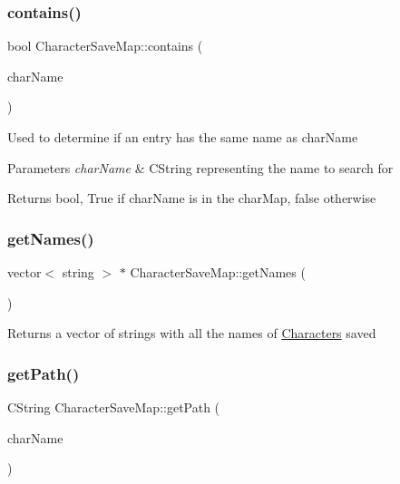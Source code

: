 \subsubsection{\texorpdfstring{contains()}{contains()}}
{\footnotesize\ttfamily bool Character\+Save\+Map\+::contains (\begin{DoxyParamCaption}\item[{const C\+String \&}]{char\+Name }\end{DoxyParamCaption})}

Used to determine if an entry has the same name as char\+Name 
\begin{DoxyParams}{Parameters}
{\em char\+Name} & C\+String representing the name to search for \\
\hline
\end{DoxyParams}
\begin{DoxyReturn}{Returns}
bool, True if char\+Name is in the char\+Map, false otherwise 
\end{DoxyReturn}
\hypertarget{class_character_save_map_a5b41ffbec363cf0c4bacc8411dcdfc90}{}\label{class_character_save_map_a5b41ffbec363cf0c4bacc8411dcdfc90} 
\subsubsection{\texorpdfstring{get\+Names()}{getNames()}}
{\footnotesize\ttfamily vector$<$ string $>$ $\ast$ Character\+Save\+Map\+::get\+Names (\begin{DoxyParamCaption}{ }\end{DoxyParamCaption})}

Returns a vector of strings with all the names of \hyperlink{class_characters}{Characters} saved \hypertarget{class_character_save_map_ae522be138bfeab45d12a255020150110}{}\label{class_character_save_map_ae522be138bfeab45d12a255020150110} 
\subsubsection{\texorpdfstring{get\+Path()}{getPath()}}
{\footnotesize\ttfamily C\+String Character\+Save\+Map\+::get\+Path (\begin{DoxyParamCaption}\item[{const C\+String \&}]{char\+Name }\end{DoxyParamCaption})}


